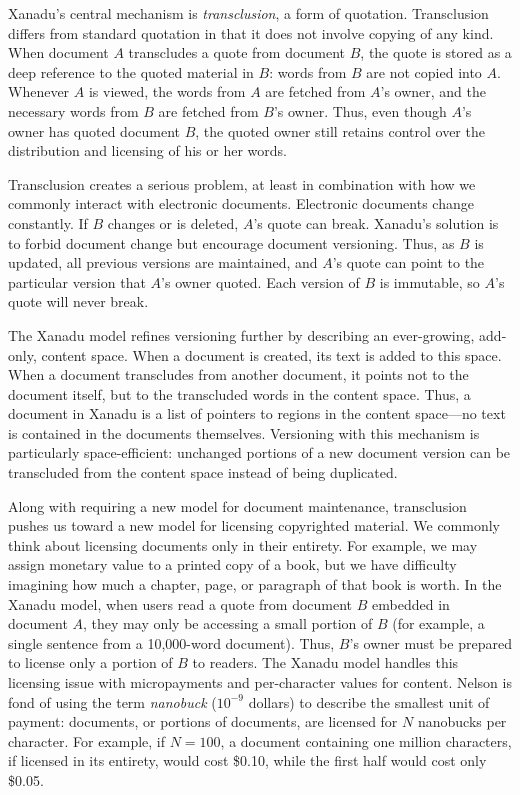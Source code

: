 \documentclass{acm_proc_article-sp}
\begin{document}
Xanadu's central mechanism is {\it transclusion}, a form of quotation.  
Transclusion differs from standard quotation in that it does not involve copying of any kind.  
When document $A$ transcludes a quote from document $B$, the quote is stored as a deep reference to the quoted material in $B$:  words from $B$ are not copied into $A$. 
Whenever $A$ is viewed, the words from $A$ are fetched from $A$'s owner, and the necessary words from $B$ are fetched from $B$'s owner.
Thus, even though $A$'s owner has quoted document $B$, the quoted owner still retains control over the distribution and licensing of his or her words.

Transclusion creates a serious problem, at least in combination with how we commonly interact with electronic documents.
Electronic documents change constantly.
If $B$ changes or is deleted, $A$'s quote can break.
Xanadu's solution is to forbid document change but encourage document versioning.
Thus, as $B$ is updated, all previous versions are maintained, and $A$'s quote can point to the particular version that $A$'s owner quoted.
Each version of $B$ is immutable, so $A$'s quote will never break.

The Xanadu model refines versioning further by describing an ever-growing, add-only, content space.  
When a document is created, its text is added to this space.
When a document transcludes from another document, it points not to the document itself, but to the transcluded words in the content space.
Thus, a document in Xanadu is a list of pointers to regions in the content space---no text is contained in the documents themselves.
Versioning with this mechanism is particularly space-efficient:  unchanged portions of a new document version can be transcluded from the content space instead of being duplicated.

Along with requiring a new model for document maintenance, transclusion pushes us toward a new model for licensing copyrighted material.
We commonly think about licensing documents only in their entirety.
For example, we may assign monetary value to a printed copy of a book, but we have difficulty imagining how much a chapter, page, or paragraph of that book is worth.
In the Xanadu model, when users read a quote from document $B$ embedded in document $A$, they may only be accessing a small portion of $B$ (for example, a single sentence from a 10,000-word document).
Thus, $B$'s owner must be prepared to license only a portion of $B$ to readers.
The Xanadu model handles this licensing issue with micropayments and per-character values for content.
Nelson is fond of using the term {\it nanobuck} ($10^{-9}$ dollars) to describe the smallest unit of payment:  documents, or portions of documents, are licensed for $N$ nanobucks per character.
For example, if $N=100$, a document containing one million characters, if licensed in its entirety, would cost \$0.10, while the first half would cost only \$0.05.
\end{document}
